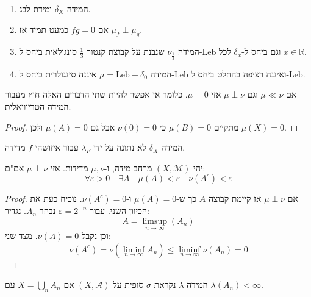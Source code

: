 \documentclass{tstextbook}
\begin{document}
\begin{example}
  \begin{enumerate}
    \item המידה \(\delta_{X}\) ומידת לבג. 


    \item אם \(fg=0\) כמעט תמיד אז \(\mu_{f}\perp \mu_{g}\). 


    \item המידה \(\nu_{\frac{1}{3}}\) שנבנת על קבוצת קנטור \(\frac{1}{3}\) סינגולאית ביחס ל-Leb וגם ביחס ל-\(\delta_{x}\) לכל \(x \in \mathbb{R}\). 


    \item המידה \(\mu=\mathrm{Leb}+\delta_{0}\) איננה סינגולרית ביחס ל-Leb ואיננה רציפה בהחלט ביחס ל-Leb. 


  \end{enumerate}
\end{example}
\begin{proposition}
אם \(\mu\ll \nu\) וגם \(\mu \perp \nu\) אזי \(\mu = 0\). כלומר אי אפשר להיות שתי הדברים האלה חוץ מעבור המידה הטריוויאלית.

\end{proposition}
\begin{proof}
מתקיים \(\mu(B)=0\) כי \(\nu(0)=0\) אבל גם \(\mu(A)=0\) ולכן \(\mu(X)=0\).

\end{proof}
\begin{corollary}
המידה \(\delta_{X}\) לא נתונה על ידי \(\lambda_{F}\) עבור איזושהי \(f\) מדידה.

\end{corollary}
\begin{proposition}
יהי \(\left( X,\mathcal{M} \right)\) מרחב מידה, ו-\(\mu,\nu\) מדידות. אזי \(\mu \perp \nu\) אם"ם:
$$ \forall\varepsilon> 0 \quad \exists A \quad  \mu(A)<\varepsilon \quad \nu(A^{c})<\varepsilon$$

\end{proposition}
\begin{proof}
אם \(\mu \perp \nu\) אז קיימת קבוצה \(A\) כך ש-\(\mu(A)=0\) ו-\(\nu(A^{c})=0\).
נוכיח כעת את הכיוון השני. עבור \(\varepsilon=2^{-n}\) נבחר \(A_{n}\). נגדיר:
$$A=\limsup_{ n \to \infty } (A_{n})$$
וכן נקבל \(\nu(A)=0\). מצד שני:
$$\nu\left( A^{c}  \right)=\nu\left( \liminf_{ n \to \infty } A_{n} \right)\leq \liminf_{ n \to \infty } \nu(A_{n})=0$$

\end{proof}
\begin{reminder}
המידה \(\lambda\) נקראת \(\sigma\) סופית על \(\left( X,\mathcal{A} \right)\) אם \(X=\bigcup_{n}A_{n}\) עם \(\lambda(A_{n})<\infty\).

\end{reminder}
\end{document}
